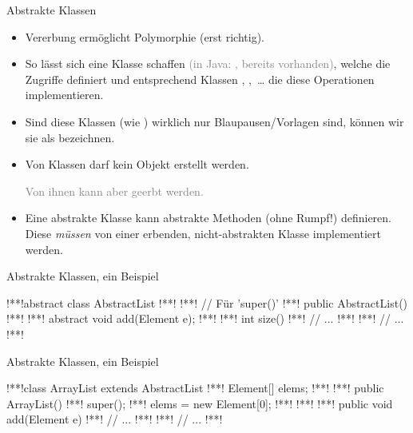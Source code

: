 \begin{frame}{Abstrakte Klassen}
    \begin{itemize}[<+(1)->]
        \widei
        \item Vererbung ermöglicht Polymorphie (erst richtig).
        \item So lässt sich eine Klasse  schaffen \textcolor{gray}{(in Java: , bereits vorhanden)}, welche die Zugriffe definiert und entsprechend Klassen , ,~\ldots\pause{} die diese Operationen implementieren.
        \item Sind diese Klassen (wie ) wirklich nur Blaupausen/\allowbreak Vorlagen sind,\pause{} können wir sie als  bezeichnen.
        \item Von  Klassen darf kein Objekt erstellt werden.\par\textcolor{gray}{Von ihnen kann aber geerbt werden.}
        \item Eine abstrakte Klasse kann abstrakte Methoden (ohne Rumpf!) definieren.\pause{} Diese \emph{müssen} von einer erbenden, nicht-abstrakten Klasse implementiert werden.
    \end{itemize}
\end{frame}

\begin{frame}[fragile,c]{Abstrakte Klassen, ein Beispiel}
\begin{plainjava}
!**!abstract class AbstractList {
!**!
!**!    // Für 'super()'
!**!    public AbstractList() { }
!**!
!**!    abstract void add(Element e);
!**!
!**!    int size() {
!**!        // ...
!**!    }
!**!    // ...
!**!}
\end{plainjava}
\end{frame}

\begin{frame}[fragile,c]{Abstrakte Klassen, ein Beispiel}
\begin{plainjava}
!**!class ArrayList extends AbstractList {
!**!    Element[] elems;
!**!
!**!    public ArrayList() {
!**!        super();
!**!        elems = new Element[0];
!**!    }
!**!
!**!    public void add(Element e) {
!**!        // ...
!**!    }
!**!    // ...
!**!}
\end{plainjava}
\end{frame}


